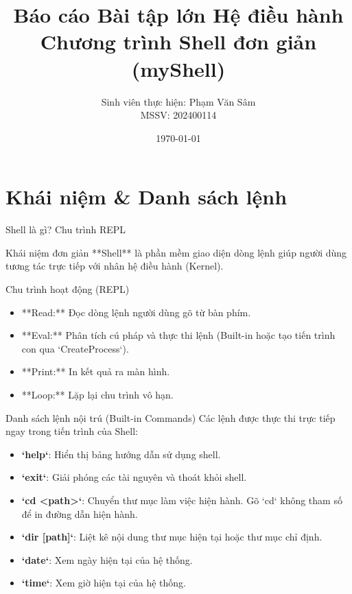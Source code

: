 \documentclass{beamer}
\title[myShell]{Báo cáo Bài tập lớn Hệ điều hành\\Chương trình Shell đơn giản (myShell)}
\author[Phạm Văn Sâm]{Sinh viên thực hiện: Phạm Văn Sâm\\MSSV: 202400114}
\institute[HUST]{Trường Đại học Bách Khoa Hà Nội}
\date{\today}
\begin{document}
\begin{frame}
    \titlepage
\end{frame}

\section{Khái niệm \& Danh sách lệnh}

\begin{frame}{Shell là gì? Chu trình REPL}
    \begin{block}{Khái niệm đơn giản}
        **Shell** là phần mềm giao diện dòng lệnh giúp người dùng tương tác trực tiếp với nhân hệ điều hành (Kernel).
    \end{block}
    \begin{block}{Chu trình hoạt động (REPL)}
        \begin{itemize}
            \item **Read:** Đọc dòng lệnh người dùng gõ từ bàn phím.
            \item **Eval:** Phân tích cú pháp và thực thi lệnh (Built-in hoặc tạo tiến trình con qua `CreateProcess`).
            \item **Print:** In kết quả ra màn hình.
            \item **Loop:** Lặp lại chu trình vô hạn.
        \end{itemize}
    \end{block}
\end{frame}

\begin{frame}{Danh sách lệnh nội trú (Built-in Commands)}
    Các lệnh được thực thi trực tiếp ngay trong tiến trình của Shell:
    \begin{itemize}
        \item \textbf{`help`}: Hiển thị bảng hướng dẫn sử dụng shell.
        \item \textbf{`exit`}: Giải phóng các tài nguyên và thoát khỏi shell.
        \item \textbf{`cd <path>`}: Chuyển thư mục làm việc hiện hành. Gõ `cd` không tham số để in đường dẫn hiện hành.
        \item \textbf{`dir [path]`}: Liệt kê nội dung thư mục hiện tại hoặc thư mục chỉ định.
        \item \textbf{`date`}: Xem ngày hiện tại của hệ thống.
        \item \textbf{`time`}: Xem giờ hiện tại của hệ thống.
    \end{itemize}
\end{frame}
\end{document}
